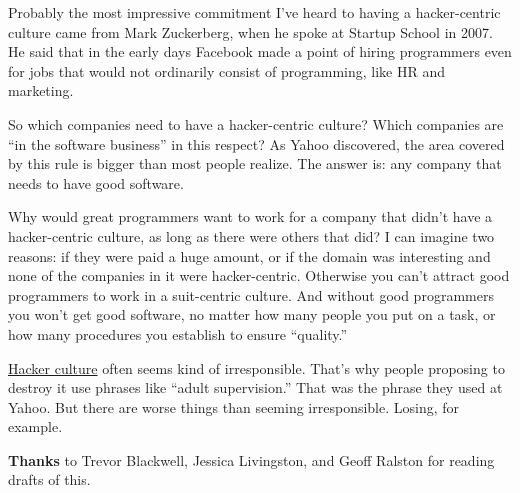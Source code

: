Probably the most impressive commitment I've heard to having a
hacker-centric culture came from Mark Zuckerberg, when he spoke at
Startup School in 2007. He said that in the early days Facebook made a
point of hiring programmers even for jobs that would not ordinarily
consist of programming, like HR and marketing.

So which companies need to have a hacker-centric culture? Which
companies are ``in the software business'' in this respect? As Yahoo
discovered, the area covered by this rule is bigger than most people
realize. The answer is: any company that needs to have good software.

Why would great programmers want to work for a company that didn't have
a hacker-centric culture, as long as there were others that did? I can
imagine two reasons: if they were paid a huge amount, or if the domain
was interesting and none of the companies in it were hacker-centric.
Otherwise you can't attract good programmers to work in a suit-centric
culture. And without good programmers you won't get good software, no
matter how many people you put on a task, or how many procedures you
establish to ensure ``quality.''

\href{gba.html}{Hacker culture} often seems kind of irresponsible.
That's why people proposing to destroy it use phrases like ``adult
supervision.'' That was the phrase they used at Yahoo. But there are
worse things than seeming irresponsible. Losing, for example.


\textbf{Thanks} to Trevor Blackwell, Jessica Livingston, and Geoff
Ralston for reading drafts of this.
